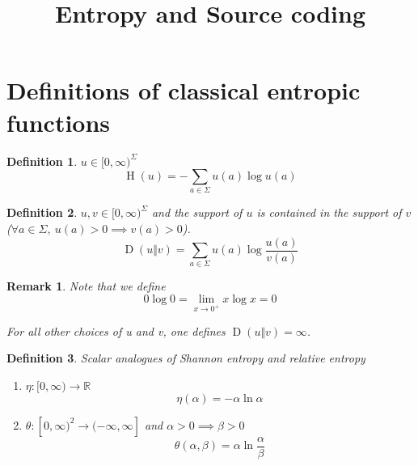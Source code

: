 \documentclass[aps,pra,onecolumn,notitlepage,superscriptaddress]{revtex4-1}
\newcommand{\R}{\mathbb{R}}
\newcommand{\op}[1]{\operatorname{#1}}
\newtheorem{defi}{Definition}
\newtheorem{rem}{Remark}
\begin{document}
    \title{Entropy and Source coding}
    \author{}
    \maketitle

    \section{Definitions of classical entropic functions}
    \begin{defi}
        $u \in [0, \infty)^{\Sigma}$
        \begin{equation}
            \boxed {
                \op H(u) = - \sum_{a \in \Sigma} u(a) \log u(a)
            }
        \end{equation}
    \end{defi}

    \begin{defi}
        $u,v \in [0, \infty)^{\Sigma}$ and the support of $u$ is contained in the support of $v$ ($\forall a \in \Sigma, \ u(a) > 0 \implies v(a) > 0$).
        \begin{equation}
            \boxed{\op D(u \Vert v) = \sum_{a \in \Sigma} u(a) \log \frac{u(a)}{v(a)} }
        \end{equation}
    \end{defi}

    
    \begin{rem}
        Note that we define
        \begin{equation}
            0 \log 0 = \lim_{x \to 0^+} x \log x = 0
        \end{equation}

        For all other choices of u and v, one defines $\op D(u \Vert v) = \infty$.
    \end{rem}

    \begin{defi}
        Scalar analogues of Shannon entropy and relative entropy
        \begin{enumerate}
            \item $\eta : [0, \infty) \to \R$
            \begin{equation}
                \boxed {
                    \eta(\alpha) = -\alpha \ln \alpha
                }
            \end{equation}
            \item $\theta : [0,\infty)^2 \to (-\infty, \infty]$ and $\alpha > 0 \implies \beta > 0$
            \begin{equation}
                \boxed {
                    \theta(\alpha, \beta) = \alpha \ln \frac{\alpha}{\beta} 
                }
            \end{equation}
        \end{enumerate}
    \end{defi}
\end{document}
